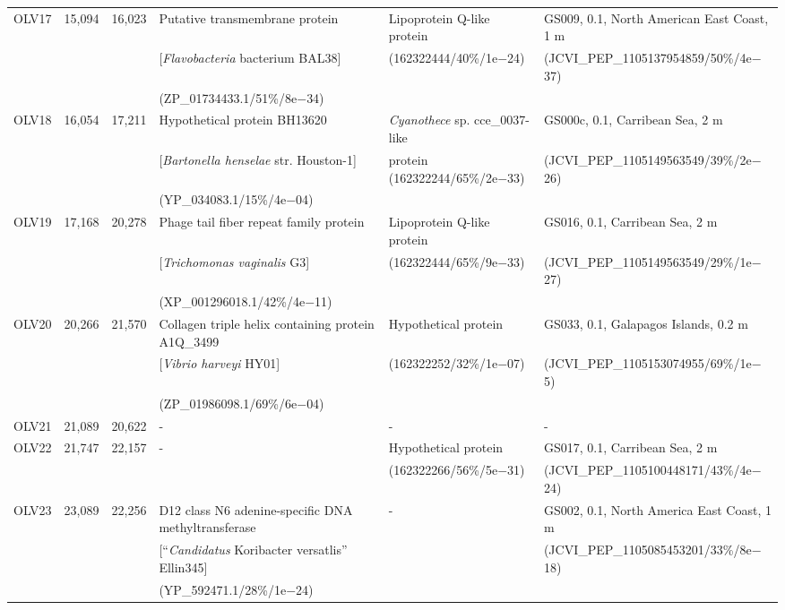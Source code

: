 \begin{landscape}
\begin{longtable}{p{0.7cm}p{0.7cm}p{0.7cm}p{8cm}p{5cm}p{7cm}}
OLV17 & 15,094 & 16,023 & Putative transmembrane protein  & Lipoprotein Q-like protein  & GS009, 0.1, North American East Coast, 1 m \\
 &  &  & [\emph{Flavobacteria} bacterium BAL38] &  (162322444/40\%/1e$-$24) & (JCVI\_PEP\_1105137954859/50\%/4e$-$37) \\
&  &  & (ZP\_01734433.1/51\%/8e$-$34) &  &  \\

OLV18 & 16,054 & 17,211 & Hypothetical protein BH13620 & \emph{Cyanothece} sp. cce\_0037-like & GS000c, 0.1, Carribean Sea, 2 m \\
 &  &  & [\emph{Bartonella henselae} str. Houston-1]  &  protein (162322244/65\%/2e$-$33) & (JCVI\_PEP\_1105149563549/39\%/2e$-$26) \\
 &  &  &  (YP\_034083.1/15\%/4e$-$04) &  &  \\

OLV19 & 17,168 & 20,278 & Phage tail fiber repeat family protein & Lipoprotein Q-like protein & GS016, 0.1, Carribean Sea, 2 m \\
 &  &  & [\emph{Trichomonas vaginalis} G3] & (162322444/65\%/9e$-$33) & (JCVI\_PEP\_1105149563549/29\%/1e$-$27)\\
 &  &  & (XP\_001296018.1/42\%/4e$-$11) &  & \\

OLV20 & 20,266 & 21,570 & Collagen triple helix containing protein A1Q\_3499 & Hypothetical protein & GS033, 0.1, Galapagos Islands, 0.2 m \\
 &  &  & [\emph{Vibrio harveyi} HY01] & (162322252/32\%/1e$-$07) & (JCVI\_PEP\_1105153074955/69\%/1e$-$5) \\
 &  &  & (ZP\_01986098.1/69\%/6e$-$04) &  &  \\

OLV21 & 21,089 & 20,622 & - & - & - \\
OLV22 & 21,747 & 22,157 & - & Hypothetical protein & GS017, 0.1, Carribean Sea, 2 m \\
 &  &  &  & (162322266/56\%/5e$-$31) & (JCVI\_PEP\_1105100448171/43\%/4e$-$24) \\

OLV23 & 23,089 & 22,256 & D12 class N6 adenine-specific DNA methyltransferase & - & GS002, 0.1, North America East Coast, 1 m \\
 &  &  &  [``\emph{Candidatus} Koribacter versatlis'' Ellin345] &  & (JCVI\_PEP\_1105085453201/33\%/8e$-$18) \\
 &  &  & (YP\_592471.1/28\%/1e$-$24) &  &  \\


\end{longtable}
\end{landscape}
